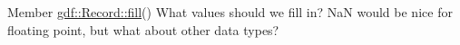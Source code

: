 \label{todo__todo000001}
\hypertarget{todo__todo000001}{}
 
\begin{DoxyDescription}
\item[Member \hyperlink{classgdf_1_1_record_ae3a20e7fb29218efb793a8440688bfa6}{gdf::Record::fill}() ]What values should we fill in? NaN would be nice for floating point, but what about other data types? 
\end{DoxyDescription}